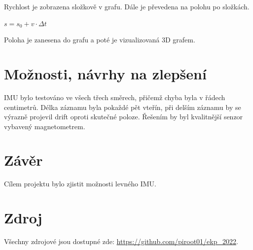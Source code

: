 \documentclass{article}
\begin{document}
Rychlost je zobrazena složkově v grafu. Dále je převedena na polohu po složkách.

\begin{center}
    \begin{math}
        s = s_{0} + v \cdot \Delta t
    \end{math}
\end{center}

Poloha je zanesena do grafu a poté je vizualizovaná 3D grafem.

\section{Možnosti, návrhy na zlepšení}

IMU bylo testováno ve všech třech směrech, přičemž chyba byla v řádech centimetrů. Délka záznamu byla pokaždé pět vteřín, při delším záznamu by se výrazně projevil drift oproti skutečné poloze. Řešením by byl kvalitnější senzor vybavený magnetometrem.

\section{Závěr}

Cílem projektu bylo zjistit možnosti levného IMU. 

\section{Zdroj}

Všechny zdrojové jsou dostupné zde: \url{https://github.com/piroot01/ekp_2022}.
\end{document}
